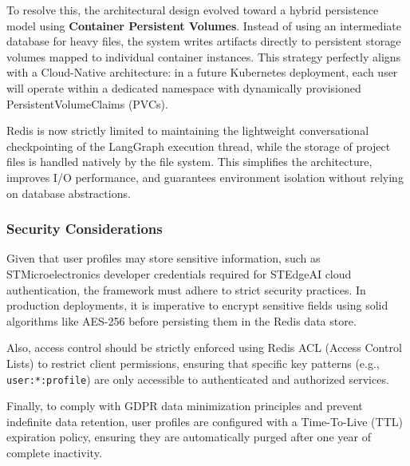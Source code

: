 To resolve this, the architectural design evolved toward a hybrid persistence model using \textbf{Container Persistent Volumes}. Instead of using an intermediate database for heavy files, the system writes artifacts directly to persistent storage volumes mapped to individual container instances. This strategy perfectly aligns with a Cloud-Native architecture: in a future Kubernetes deployment, each user will operate within a dedicated namespace with dynamically provisioned PersistentVolumeClaims (PVCs).

Redis is now strictly limited to maintaining the lightweight conversational checkpointing of the LangGraph execution thread, while the storage of project files is handled natively by the file system. This simplifies the architecture, improves I/O performance, and guarantees environment isolation without relying on database abstractions.

\subsubsection{Security Considerations}

Given that user profiles may store sensitive information, such as STMicroelectronics developer credentials required for STEdgeAI cloud authentication, the framework must adhere to strict security practices. In production deployments, it is imperative to encrypt sensitive fields using solid algorithms like AES-256 before persisting them in the Redis data store.

Also, access control should be strictly enforced using Redis ACL (Access Control Lists) to restrict client permissions, ensuring that specific key patterns (e.g., \texttt{user:*:profile}) are only accessible to authenticated and authorized services.

Finally, to comply with GDPR data minimization principles and prevent indefinite data retention, user profiles are configured with a Time-To-Live (TTL) expiration policy, ensuring they are automatically purged after one year of complete inactivity.
